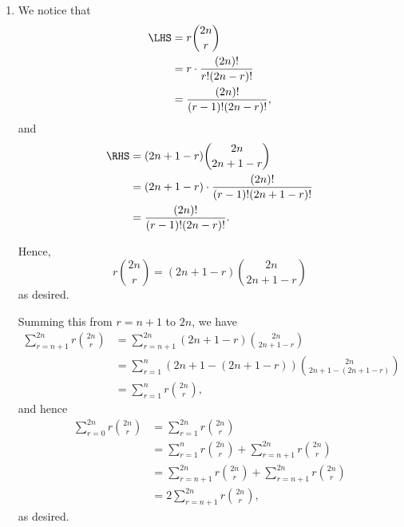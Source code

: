 \Question{\currfilebase}
\begin{enumerate}
    \item We notice that
          \begin{align*}
              \LHS & = r \binom{2n}{r}                    \\
                   & = r \cdot \frac{(2n)!}{r! (2n - r)!} \\
                   & = \frac{(2n)!}{(r - 1)! (2n - r)!},
          \end{align*}
          and
          \begin{align*}
              \RHS & = (2n + 1 - r) \binom{2n}{2n + 1 - r}                     \\
                   & = (2n + 1 - r) \cdot \frac{(2n)!}{(r - 1)! (2n + 1 - r)!} \\
                   & = \frac{(2n)!}{(r - 1)! (2n - r)!}.
          \end{align*}

          Hence,
          \[
              r \binom{2n}{r} = (2n + 1 - r) \binom{2n}{2n + 1 - r}
          \]
          as desired.

          Summing this from \(r = n + 1\) to \(2n\), we have
          \begin{align*}
              \sum_{r = n + 1}^{2n} r \binom{2n}{r} & = \sum_{r = n + 1}^{2n} (2n + 1 - r) \binom{2n}{2n + 1 - r}                  \\
                                                    & = \sum_{r = 1}^{n} (2n + 1 - (2n + 1 - r)) \binom{2n}{2n + 1 - (2n + 1 - r)} \\
                                                    & = \sum_{r = 1}^{n} r \binom{2n}{r},
          \end{align*}
          and hence
          \begin{align*}
              \sum_{r = 0}^{2n} r \binom{2n}{r} & = \sum_{r = 1}^{2n} r \binom{2n}{r}                                             \\
                                                & = \sum_{r = 1}^{n} r \binom{2n}{r} + \sum_{r = n + 1}^{2n} r \binom{2n}{r}      \\
                                                & = \sum_{r = n + 1}^{2n} r \binom{2n}{r} + \sum_{r = n + 1}^{2n} r \binom{2n}{r} \\
                                                & = 2 \sum_{r = n + 1}^{2n} r \binom{2n}{r},
          \end{align*}
          as desired.


\end{enumerate}
